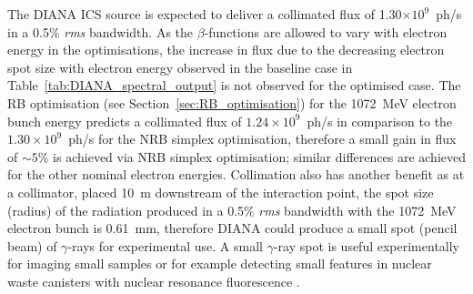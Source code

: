 \documentclass[../main.tex]{subfiles}
\begin{document}
The DIANA ICS source is expected to deliver a collimated flux of 1.30$\times 10^{9}$~ph/\si{\second} in a 0.5\% \textit{rms} bandwidth. As the $\beta$-functions are allowed to vary with electron energy in the optimisations, the increase in flux due to the decreasing electron spot size with electron energy observed in the baseline case in Table~\ref{tab:DIANA_spectral_output} is not observed for the optimised case. The RB optimisation (see Section~\ref{sec:RB_optimisation}) for the 1072~\si{\mega\electronvolt} electron bunch energy predicts a collimated flux of $1.24\times 10^{9}$~ph/\si{\second} in comparison to the $1.30\times 10^{9}$~ph/\si{\second} for the NRB simplex optimisation, therefore a small gain in flux of $\sim5$\% is achieved via NRB simplex optimisation; similar differences are achieved for the other nominal electron energies. Collimation also has another benefit as at a collimator, placed 10~\si{\meter} downstream of the interaction point, the spot size (radius) of the radiation produced in a 0.5\% \textit{rms} bandwidth with the 1072~\si{\mega\electronvolt} electron bunch is 0.61~\si{\milli\meter}, therefore DIANA could produce a small spot (pencil beam) of $\gamma$-rays for experimental use. A small $\gamma$-ray spot is useful experimentally for imaging small samples or for example detecting small features in nuclear waste canisters with nuclear resonance fluorescence \cite{angell2015demonstration}.  
\end{document}
